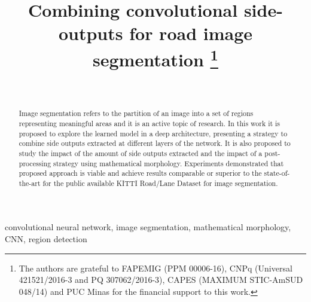 \documentclass[conference]{IEEEtran}
\begin{document}
\title{Combining convolutional side-outputs for road image segmentation
\thanks{The authors are grateful to FAPEMIG (PPM 00006-16), CNPq (Universal 421521/2016-3 and PQ 307062/2016-3), CAPES (MAXIMUM STIC-AmSUD 048/14) and PUC Minas for the financial support to this work.}
}

\author{
\\
}

\maketitle

\begin{abstract}
\color{white}Image segmentation refers to the partition of an image into a set of regions representing meaningful areas and it is an active topic of research.  In this work it is proposed to explore the learned model in a deep architecture, presenting a strategy to combine side outputs extracted at different layers of the network. It is also proposed to study the impact of the amount of side outputs extracted and the impact of a post-processing strategy using mathematical morphology. Experiments demonstrated that proposed approach is viable and  achieve results comparable or superior to the state-of-the-art for the public available KITTI Road/Lane Dataset for image segmentation.
\end{abstract}

\begin{IEEEkeywords}
convolutional neural network, image segmentation, mathematical morphology, CNN, region detection
\end{IEEEkeywords}


%







\end{document}
